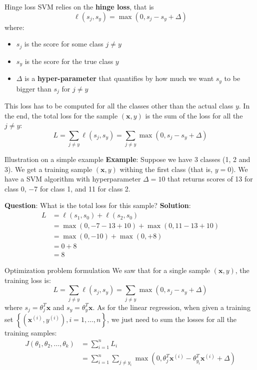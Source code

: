 \documentclass{beamer}
\newcommand{\1}[1]{\mathbbm{1}\left[#1\right]}
\newcommand{\yi}{y^{(i)}}
\newcommand{\bx}{\bm{x}}
\newcommand{\bxi}{\bx^{(i)}}
\newcommand{\pv}{\pause\vfill}
\begin{document}
\begin{frame}{Hinge loss}
SVM relies on the \textbf{hinge loss}, that is
\begin{equation*}
\ell(s_j, s_y) = \max(0, s_j - s_y + \Delta)
\end{equation*}
where:
\begin{itemize}
	\item $s_j$ is the score for some class $j \neq y$
	\item $s_y$ is the score for the true class $y$
	\item $\Delta$ is a \textbf{hyper-parameter} that quantifies by how much we want $s_y$ to be bigger than $s_j$ for $j \neq y$
\end{itemize}
\pv
This loss has to be computed for all the classes other than the actual class $y$. In the end, the total loss for the sample $(\bx, y)$ is the sum of the loss for all the $j \neq y$:
\begin{equation*}
L = \sum_{j \neq y} \ell(s_j, s_y) = \sum_{j \neq y} \max(0, s_j - s_y + \Delta)
\end{equation*}
\end{frame}

\begin{frame}{Illustration on a simple example}
\textbf{Example}: Suppose we have 3 classes (1, 2 and 3). We get a training sample $(\bx, y)$ withing the first class (that is, $y = 0$). We have a SVM algorithm with hyperparameter $\Delta = 10$ that returns scores of 13 for class 0, −7 for class 1, and 11 for class 2. 

\textbf{Question}: What is the total loss for this sample?
\pv
\textbf{Solution}: 
\begin{equation*}
\begin{split}
L 	&=  \ell(s_1, s_0) + \ell(s_2, s_0) \\
	&= \max(0,−7−13+10) + \max(0,11−13+10) \\
	&= \max(0, -10) + \max(0, +8) \\
	&= 0 + 8 \\
	&= 8
\end{split}
\end{equation*}
\end{frame}

\begin{frame}{Optimization problem formulation}
We saw that for a single sample $(\bx, y)$, the training loss is:
\begin{equation*}
L = \sum_{j \neq y} \ell(s_j, s_y) = \sum_{j \neq y} \max(0, s_j - s_y + \Delta)
\end{equation*}
where $s_j = \theta_j^T \bx$ and $s_y = \theta_y^T \bx$.
\pv
As for the linear regression, when given a training set $\left\{ (\bxi, \yi), i =1, \dots, n\right\}$, we just need to sum the losses for all the training samples:
\begin{equation*}
\begin{split}
J(\theta_1, \theta_2, \dots, \theta_k) 
	&= \sum_{i = 1}^n L_i \\
	&= \sum_{i = 1}^n \sum_{j \neq y_i} \max(0, \theta_j^T\bxi - \theta_{y_i}^T\bxi + \Delta)
\end{split}
\end{equation*}
\end{frame}
\end{document}

